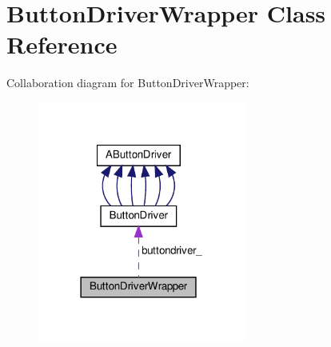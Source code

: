 \hypertarget{classButtonDriverWrapper}{}\section{Button\+Driver\+Wrapper Class Reference}
\label{classButtonDriverWrapper}


Collaboration diagram for Button\+Driver\+Wrapper\+:
\nopagebreak
\begin{figure}[H]
\begin{center}
\leavevmode
\includegraphics[width=194pt]{classButtonDriverWrapper__coll__graph}
\end{center}
\end{figure}
